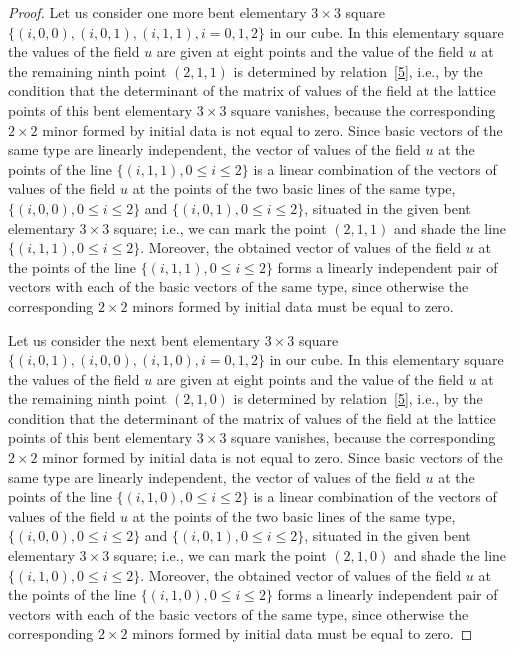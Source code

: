 \documentclass[11pt]{article}
\begin{document}
\begin{proof}
Let us consider one more bent elementary $3 \times 3$ square $\{(i,
0, 0), (i, 0, 1), (i, 1, 1), i = 0, 1, 2\}$ in our cube. In this
elementary square the values of the f\/ield $u$ are given at eight
points and the value of the f\/ield $u$ at the remaining ninth point
$(2, 1, 1)$ is determined by relation~\eqref{5}, i.e., by the
condition that the determinant of the matrix of values of the f\/ield
at the lattice points of this bent elementary $3 \times 3$ square
vanishes, because the corresponding $2 \times 2$ minor formed by
initial data is not equal to zero. Since basic vectors of the same
type are linearly independent, the vector of values of the f\/ield $u$
at the points of the line $\{(i, 1, 1), 0 \leq i \leq 2\}$ is a
linear combination of the vectors of values of the f\/ield $u$ at the
points of the two basic lines of the same type, $\{(i, 0, 0), 0 \leq
i \leq 2\}$ and $\{(i, 0, 1), 0 \leq i \leq 2\}$, situated in the
given bent elementary $3 \times 3$ square; i.e., we can mark the
point $(2, 1, 1)$ and shade the line $\{(i, 1, 1), 0 \leq i \leq
2\}$. Moreover, the obtained vector of values of the f\/ield $u$ at
the points of the line $\{(i, 1, 1), 0 \leq i \leq 2\}$ forms a
linearly independent pair of vectors with each of the basic vectors
of the same type, since otherwise the corresponding $2 \times 2$
minors formed by initial data must be equal to zero.



Let us consider the next bent elementary $3 \times 3$ square $\{(i,
0, 1), (i, 0, 0), (i, 1, 0),  i = 0, 1, 2\}$ in our cube. In this
elementary square the values of the f\/ield $u$ are given at eight
points and the value of the f\/ield $u$ at the remaining ninth point
$(2, 1, 0)$ is determined by relation~\eqref{5}, i.e., by the
condition that the determinant of the matrix of values of the f\/ield
at the lattice points of this bent elementary $3 \times 3$ square
vanishes, because the corresponding $2 \times 2$ minor formed by
initial data is not equal to zero. Since basic vectors of the same
type are linearly independent, the vector of values of the f\/ield $u$
at the points of the line $\{(i, 1, 0), 0 \leq i \leq 2\}$ is a
linear combination of the vectors of values of the f\/ield $u$ at the
points of the two basic lines of the same type, $\{(i, 0, 0), 0 \leq
i \leq 2\}$ and $\{(i, 0, 1), 0 \leq i \leq 2\}$, situated in the
given bent elementary $3 \times 3$ square; i.e., we can mark the
point $(2, 1, 0)$ and shade the line $\{(i, 1, 0), 0 \leq i \leq
2\}$. Moreover, the obtained vector of values of the f\/ield $u$ at
the points of the line $\{(i, 1, 0), 0 \leq i \leq 2\}$ forms a
linearly independent pair of vectors with each of the basic vectors
of the same type, since otherwise the corresponding $2 \times 2$
minors formed by initial data must be equal to zero.





\end{proof}
\end{document}
